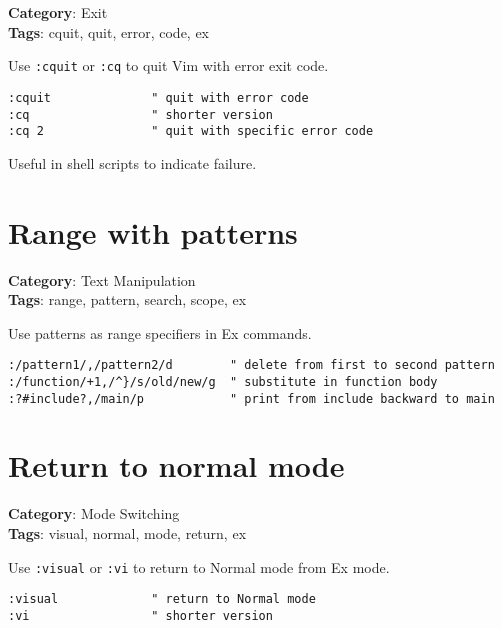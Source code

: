{{{{{\textbf{Category}: Exit\\ \textbf{Tags}: cquit, quit, error, code, ex
\vspace{0.5cm}

Use {\footnotesize \Verb§:cquit§} or {\footnotesize \Verb§:cq§} to quit Vim with error exit code.

\begin{Exa*}{}
\begin{Verbatim}[fontsize=\footnotesize, breaklines, breakanywhere]
:cquit              " quit with error code
:cq                 " shorter version  
:cq 2               " quit with specific error code
\end{Verbatim}
\end{Exa*}

Useful in shell scripts to indicate failure.

\section{Range with patterns}

\textbf{Category}: Text Manipulation\\ \textbf{Tags}: range, pattern, search, scope, ex
\vspace{0.5cm}

Use patterns as range specifiers in Ex commands.

\begin{Exa*}{}
\begin{Verbatim}[fontsize=\footnotesize, breaklines, breakanywhere]
:/pattern1/,/pattern2/d        " delete from first to second pattern
:/function/+1,/^}/s/old/new/g  " substitute in function body
:?#include?,/main/p            " print from include backward to main
\end{Verbatim}
\end{Exa*}

\section{Return to normal mode}

\textbf{Category}: Mode Switching\\ \textbf{Tags}: visual, normal, mode, return, ex
\vspace{0.5cm}

Use {\footnotesize \Verb§:visual§} or {\footnotesize \Verb§:vi§} to return to Normal mode from Ex mode.

\begin{Exa*}{}
\begin{Verbatim}[fontsize=\footnotesize, breaklines, breakanywhere]
:visual             " return to Normal mode
:vi                 " shorter version
\end{Verbatim}
\end{Exa*}

}}}}}
